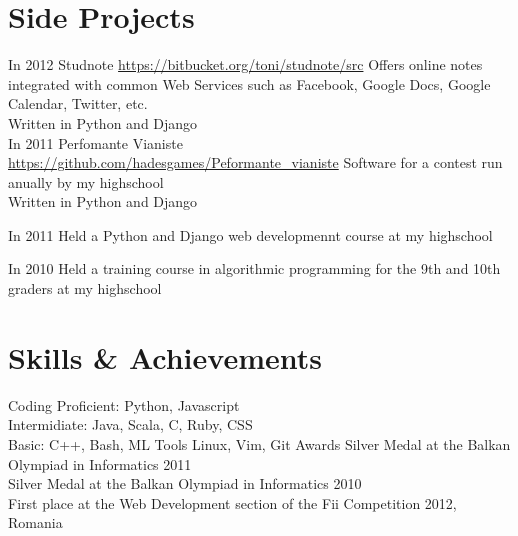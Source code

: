 \documentclass[]{friggeri-cv}
\begin{document}
\section{Side Projects}

\begin{entrylist}
  \entry
  {In 2012} 
  {}
  {Studnote}
  {\href{http://bitbucket.org/toni/studnote/src}{https://bitbucket.org/toni/studnote/src}}
  {
    Offers online notes integrated with common Web Services such as Facebook, Google Docs, Google Calendar, Twitter, etc. \\
    Written in Python and Django \\ 
  }
  \entry
  {In 2011}
  {}
  {Perfomante Vianiste}
  {
    \href{https://github.com/hadesgames/Performante\_vianiste}{https://github.com/hadesgames/Peformante\_vianiste}
  }
  {
    Software for a contest run anually by my highschool \\
    Written in Python and Django \\
  }

  \entry
  {In 2011}
  {}
  {Held a Python and Django web developmennt course at my highschool}
  {}
  {}

  \entry
  {In 2010}
  {}
  {Held a training course in algorithmic programming for the 9th and 10th graders at my highschool}
  {}
  {}
\end{entrylist}

\section{Skills \& Achievements}
\begin{entrylist}
  \entry
  {Coding}{}
  {
    Proficient:  Python, Javascript \\
    Intermidiate:  Java, Scala, C, Ruby, CSS \\
    Basic:  C++, Bash, ML
  }{}{}
  \entry
  {Tools}{}
  {
    Linux, Vim, Git
  }{}{}
  \entry
  {Awards}{}
  {
    Silver Medal at the Balkan Olympiad in Informatics 2011 \\
  Silver Medal at the Balkan Olympiad in Informatics 2010 \\
  First place at the Web Development section of the Fii Competition 2012, Romania
  }
  {}{}
\end{entrylist}
\end{document}
